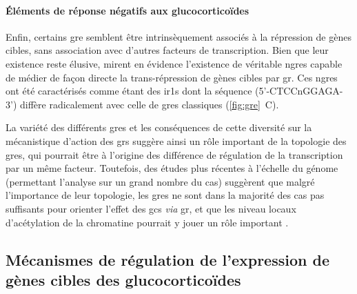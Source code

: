 \documentclass[../main.tex]{subfiles}
\begin{document}
\paragraph{Éléments de réponse négatifs aux glucocorticoïdes}
Enfin, certains \gls{gre} semblent être intrinsèquement associés à la répression de gènes cibles, sans association avec d'autres facteurs de transcription.
Bien que leur existence reste élusive, \citet{Surjit2011} mirent en évidence l'existence de véritable \glspl{ngre} capable de médier de façon directe la trans-répression de gènes cibles par \gls{gr}.
Ces \glspl{ngre} ont été caractérisés comme étant des \glspl{ir1} dont la séquence (5'-CTCCnGGAGA-3') diffère radicalement avec celle de \glspl{gre} classiques (\autoref{fig:gre}~C).
\\
\par
La variété des différents \glspl{gre} et les conséquences de cette diversité sur la mécanistique d'action des \glspl{gr} suggère ainsi un rôle important de la topologie des \glspl{gre}, qui pourrait être à l'origine des différence de régulation de la transcription par un même facteur.
Toutefois, des études plus récentes à l'échelle du génome (permettant l'analyse sur un grand nombre du cas) suggèrent que malgré l'importance de leur topologie, les \glspl{gre} ne sont dans la majorité des cas pas suffisants pour orienter l'effet des \glspl{gc} \textit{via} \gls{gr}, et que les niveau locaux d'acétylation de la chromatine pourrait y jouer un rôle important \citep{Uhlenhaut2013}.


\subsection{Mécanismes de régulation de l'expression de gènes cibles des glucocorticoïdes}\label{subsec:meca-action-gc-via-gr}
\end{document}
